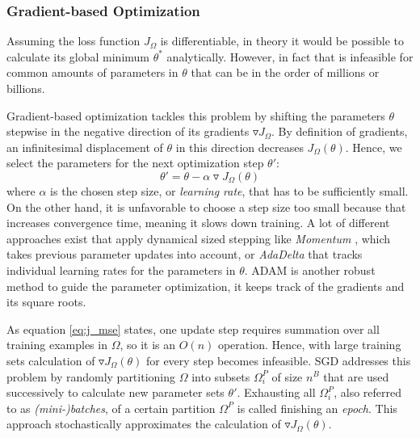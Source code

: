 \subsubsection{Gradient-based Optimization} \label{subsec:gradient_optimization}
Assuming the loss function $J_\Omega$ is differentiable, in theory it would be possible to calculate its global minimum $\theta^*$ analytically. However, in fact that is infeasible for common amounts of parameters in $\theta$ that can be in the order of millions or billions.  

Gradient-based optimization tackles this problem by shifting the parameters $\theta$ stepwise in the negative direction of its gradients $\triangledown J_\Omega$. By definition of gradients, an infinitesimal displacement of $\theta$ in this direction decreases $J_\Omega(\theta)$. Hence, we select the parameters for the next optimization step $\theta'$:
\begin{equation}
\theta' = \theta - \alpha\triangledown J_\Omega(\theta)
\end{equation}
where $\alpha$ is the chosen step size, or \textit{learning rate}, that has to be sufficiently small. On the other hand, it is unfavorable to choose a step size too small because that increases convergence time, meaning it slows down training. A lot of different approaches exist that apply dynamical sized stepping like \textit{Momentum} \autocite{polyak_methods_1964}, which takes previous parameter updates into account, or \textit{AdaDelta} \autocite{zeiler_adadelta_2012} that tracks individual learning rates for the parameters in $\theta$. ADAM \autocite{kingma_adam_2014} is another robust method to guide the parameter optimization, it keeps track of the gradients and its square roots.   

As equation \eqref{eq:j_mse} states, one update step requires summation over all training examples in $\Omega$, so it is an $O(n)$ operation. Hence, with large training sets calculation of $\triangledown J_\Omega(\theta)$ for every step becomes infeasible. \ac{SGD} addresses this problem by randomly partitioning $\Omega$ into subsets $\Omega^P_i$ of size $n^B$ that are used successively to calculate new parameter sets $\theta'$. Exhausting all $\Omega^P_i$, also referred to as \textit{(mini-)batches}, of a certain partition $\Omega^P$ is called finishing an \textit{epoch}. This approach stochastically approximates the calculation of $\triangledown J_\Omega(\theta)$.

